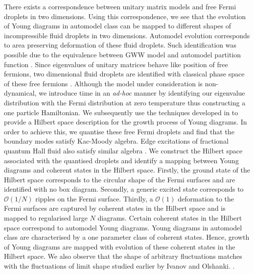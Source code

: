 \documentclass[final,3p,12pt,times]{elsarticle}
\numberwithin{equation}{section}
\begin{document}
There exists a correspondence between unitary matrix models and free Fermi droplets in two dimensions. Using this correspondence, we see that the evolution of Young diagrams in automodel class can be mapped to different shapes of incompressible fluid droplets in two dimensions. Automodel evolution corresponds to area preserving deformation of these fluid droplets. Such identification was possible due to the equivalence between GWW model and automodel partition function \cite{duttagopakumar}. Since eigenvalues of unitary matrices behave like position of free fermions, two dimensional fluid droplets are identified with classical phase space of these free fermions \cite{duttagopakumar,Chattopadhyay}. Although the model under consideration is non-dynamical, we introduce time in an \emph{ad-hoc} manner by identifying our eigenvalue distribution with the Fermi distribution at zero temperature thus constructing a one particle Hamiltonian. We subsequently use the techniques developed in \cite{Chattopadhyay:2020rle} to provide a Hilbert space description for the growth process of Young diagrams. In order to achieve this, we quantise these free Fermi droplets and find that the boundary modes satisfy Kac-Moody algebra. Edge excitations of fractional quantum Hall fluid also satisfy similar algebra \cite{Wen:1995qn}. We construct the Hilbert space associated with the quantised droplets and identify a mapping between Young diagrams and coherent states in the Hilbert space. Firstly, the ground state of the Hilbert space corresponds to the circular shape of the Fermi surfaces and are identified with no box diagram. Secondly, a generic excited state corresponds to $\mathcal{O}(1/N)$ ripples on the Fermi surface. Thirdly, a $\mathcal{O}(1)$ deformation to the Fermi surfaces are captured by coherent states in the Hilbert space and is mapped to regularised large $N$ diagrams. Certain coherent states in the Hilbert space correspond to automodel Young diagrams. Young diagrams in automodel class are characterised by a one parameter class of coherent states. Hence, growth of Young diagrams are mapped with evolution of these coherent states in the Hilbert space. We also observe that the shape of arbitrary fluctuations matches with the fluctuations of limit shape studied earlier by Ivanov and Olshanki. \cite{2003math.4010I}.
\end{document}
